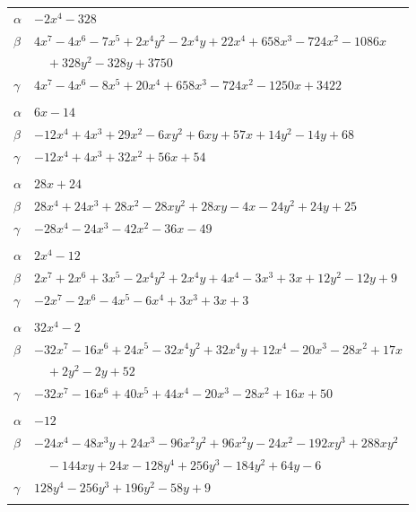 \documentclass[11pt]{article}
\begin{document}
\begin{longtable}{@{}ll@{}}
$\alpha$ & $-2x^{4}-328$\\
$\beta$ & $4x^{7}-4x^{6}-7x^{5}+2x^{4}y^{2}-2x^{4}y+22x^{4}+658x^{3}-724x^{2}-1086x$\\
 & $\quad +328y^{2}-328y+3750$\\
$\gamma$ & $4x^{7}-4x^{6}-8x^{5}+20x^{4}+658x^{3}-724x^{2}-1250x+3422$\\
\addlinespace[3pt]
\multicolumn{2}{@{}l}{$\{i,j\}=\{5,20\}$, $k_{ij}=2\cdot 3\cdot 5^{2}$}\\
$\alpha$ & $6x-14$\\
$\beta$ & $-12x^{4}+4x^{3}+29x^{2}-6xy^{2}+6xy+57x+14y^{2}-14y+68$\\
$\gamma$ & $-12x^{4}+4x^{3}+32x^{2}+56x+54$\\
\addlinespace[3pt]
\multicolumn{2}{@{}l}{$\{i,j\}=\{5,26\}$, $k_{ij}=3\cdot 5^{2}$}\\
$\alpha$ & $28x+24$\\
$\beta$ & $28x^{4}+24x^{3}+28x^{2}-28xy^{2}+28xy-4x-24y^{2}+24y+25$\\
$\gamma$ & $-28x^{4}-24x^{3}-42x^{2}-36x-49$\\
\addlinespace[3pt]
\multicolumn{2}{@{}l}{$\{i,j\}=\{5,32\}$, $k_{ij}=2\cdot 3\cdot 5$}\\
$\alpha$ & $2x^{4}-12$\\
$\beta$ & $2x^{7}+2x^{6}+3x^{5}-2x^{4}y^{2}+2x^{4}y+4x^{4}-3x^{3}+3x+12y^{2}-12y+9$\\
$\gamma$ & $-2x^{7}-2x^{6}-4x^{5}-6x^{4}+3x^{3}+3x+3$\\
\addlinespace[3pt]
\multicolumn{2}{@{}l}{$\{i,j\}=\{5,40\}$, $k_{ij}=2^{2}\cdot 3\cdot 13$}\\
$\alpha$ & $32x^{4}-2$\\
$\beta$ & $-32x^{7}-16x^{6}+24x^{5}-32x^{4}y^{2}+32x^{4}y+12x^{4}-20x^{3}-28x^{2}+17x$\\
 & $\quad +2y^{2}-2y+52$\\
$\gamma$ & $-32x^{7}-16x^{6}+40x^{5}+44x^{4}-20x^{3}-28x^{2}+16x+50$\\
\addlinespace[3pt]
\multicolumn{2}{@{}l}{$\{i,j\}=\{6,9\}$, $k_{ij}=3^{2}$}\\
$\alpha$ & $-12$\\
$\beta$ & $-24x^{4}-48x^{3}y+24x^{3}-96x^{2}y^{2}+96x^{2}y-24x^{2}-192xy^{3}+288xy^{2}$\\
 & $\quad -144xy+24x-128y^{4}+256y^{3}-184y^{2}+64y-6$\\
$\gamma$ & $128y^{4}-256y^{3}+196y^{2}-58y+9$\\
\addlinespace[3pt]
\multicolumn{2}{@{}l}{$\{i,j\}=\{6,11\}$, $k_{ij}=3\cdot 13^{2}$}\\

\end{longtable}
\end{document}
